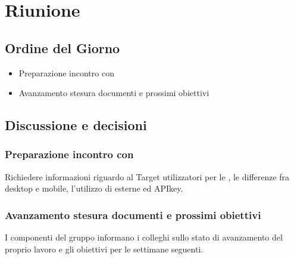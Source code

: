 \section{Riunione}
\subsection{Ordine del Giorno}
\begin{itemize}
	\item Preparazione incontro con \Proponente
	\item Avanzamento stesura documenti e prossimi obiettivi
\end{itemize}

\subsection{Discussione e decisioni}
\subsubsection{Preparazione incontro con \Proponente}
Richiedere informazioni riguardo al Target utilizzatori per le , le differenze fra  desktop e mobile, l'utilizzo di  esterne ed APIkey.

\subsubsection{Avanzamento stesura documenti e prossimi obiettivi}
I componenti del gruppo informano i colleghi sullo stato di avanzamento del proprio lavoro e gli obiettivi per le settimane seguenti.


\clearpage
